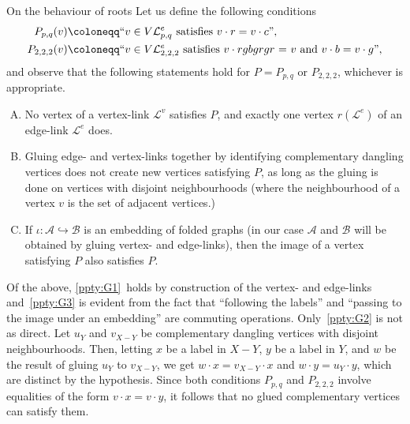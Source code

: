 \documentclass[ALCO,ThmDefs,Unicode,epreuves]{cedram}
\newcommand{\cA}{\mathcal{A}}
\newcommand{\cB}{\mathcal{B}}
\newcommand{\cL}{\mathcal{L}}
\begin{document}
\begin{enonce*}[remark]
{On the behaviour of roots} Let us define the following conditions
\begin{alignat*}{10}
P_{p,q}(v) &\coloneqq \text{$``v\in V\cL_{p,q}^e$ satisfies $v\cdot r = v\cdot c$''},\\
P_{2,2,2}(v) &\coloneqq \text{``$v\in V\cL_{2,2,2}^e$ satisfies $v\cdot rgbgrgr$ = $v$ and $v\cdot b = v\cdot g$''},
\end{alignat*}
and observe that the following statements hold for $P = P_{p,q}$ or $P_{2,2,2}$, whichever is appropriate.

\begin{enumerate}[G.\arabic{enumi}]
\item \label{ppty:G1} No vertex of a vertex-link $\cL^v$ satisfies $P$, and exactly one vertex $r(\cL^e)$ of an edge-link $\cL^e$ does.
\item \label{ppty:G2} Gluing edge- and vertex-links together by identifying complementary dangling vertices does not create new vertices satisfying $P$, as long as the gluing is done on vertices with disjoint neighbourhoods (where the neighbourhood of a vertex $v$ is the set of adjacent vertices.)
\item \label{ppty:G3} If $\iota:\cA \hookrightarrow \cB$ is an embedding of folded graphs (in our case $\cA$ and $\cB$ will be obtained by gluing vertex- and edge-links), then the image of a vertex satisfying $P$ also satisfies $P$. 
\end{enumerate}

Of the above, \ref{ppty:G1}~holds by construction of the vertex- and edge-links and~\ref{ppty:G3} is evident from the fact that ``following the labels'' and ``passing to the image under an embedding'' are commuting operations. Only~\ref{ppty:G2} is not as direct. Let $u_Y$ and $v_{X-Y}$ be complementary dangling vertices with disjoint neighbourhoods. Then, letting $x$ be a label in $X-Y$, $y$ be a label in $Y$, and $w$ be the result of gluing $u_Y$ to $v_{X-Y}$, we get $w\cdot x = v_{X-Y} \cdot x$ and $w\cdot y = u_Y\cdot y$, which are distinct by the hypothesis. Since both conditions $P_{p,q}$ and $P_{2,2,2}$ involve equalities of the form $v\cdot x = v\cdot y$, it follows that no glued complementary vertices can satisfy them.
\end{enonce*}
\end{document}
